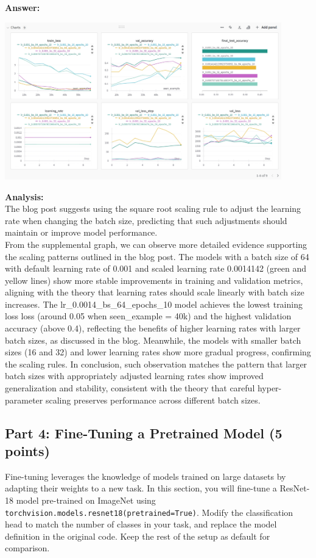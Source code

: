 \documentclass[11pt, oneside]{article}   	%
\begin{document}
\textbf{Answer:} \\
\begin{center}
    \includegraphics[width=0.9\textwidth]{report_pic/LearningRateBatch.png}
\end{center}

\textbf{Analysis: }
\\
The blog post suggests using the square root scaling rule to adjust the learning rate when changing the batch size, predicting that such adjustments should maintain or improve model performance.
\\
From the supplemental graph, we can observe more detailed evidence supporting the scaling patterns outlined in the blog post. The models with a batch size of 64 with default learning rate of 0.001 and scaled learning rate 0.0014142 (green and yellow lines) show more stable improvements in training and validation metrics, aligning with the theory that learning rates should scale linearly with batch size increases. The lr\_0.0014\_bs\_64\_epochs\_10 model achieves the lowest training loss loss (around 0.05 when seen\_example = 40k) and the highest validation accuracy (above 0.4), reflecting the benefits of higher learning rates with larger batch sizes, as discussed in the blog. Meanwhile, the models with smaller batch sizes (16 and 32) and lower learning rates show more gradual progress, confirming the scaling rules. In conclusion, such observation matches the pattern that larger batch sizes with appropriately adjusted learning rates show improved generalization and stability, consistent with the theory that careful hyper-parameter scaling preserves performance across different batch sizes.

\subsection*{Part 4: Fine-Tuning a Pretrained Model (5 points)}
Fine-tuning leverages the knowledge of models trained on large datasets by adapting their weights to a new task. In this section, you will fine-tune a ResNet-18 model pre-trained on ImageNet using \texttt{torchvision.models.resnet18(pretrained=True)}. Modify the classification head to match the number of classes in your task, and replace the model definition in the original code. Keep the rest of the setup as default for comparison.
\end{document}
